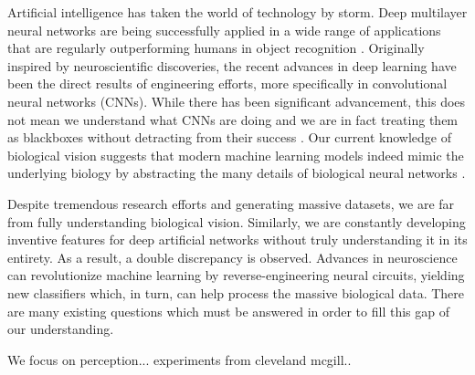 
\maketitle

Artificial intelligence has taken the world of technology by storm. Deep multilayer neural networks are being successfully applied in a wide range of applications that are regularly outperforming humans in object recognition \cite{krizhevsky_imagenet2012, simonyan_very_deep2014,szegedy2015}. 
Originally inspired by neuroscientific discoveries, the recent advances in deep learning have been the direct results of engineering efforts, more specifically in convolutional neural networks (CNNs). 
While there has been significant advancement, this does not mean we understand what CNNs are doing and we are in fact treating them as blackboxes without detracting from their success \cite{goodfellow_book, deeplearning_blackbox2017}. 
Our current knowledge of biological vision suggests that modern machine learning models indeed mimic the underlying biology by abstracting the many details of biological neural networks \cite{yamins2016using, hassabis2017neuroscience}.

Despite tremendous research efforts and generating massive datasets, we are far from fully understanding biological vision. 
Similarly, we are constantly developing inventive features for deep artificial networks without truly understanding it in its entirety. As a result, a double discrepancy is observed. 
Advances in neuroscience can revolutionize machine learning by reverse-engineering neural circuits, yielding new classifiers which, in turn, can help process the massive biological data. 
There are many existing questions which must be answered in order to fill this gap of our understanding.

We focus on perception... experiments from cleveland mcgill..



%

